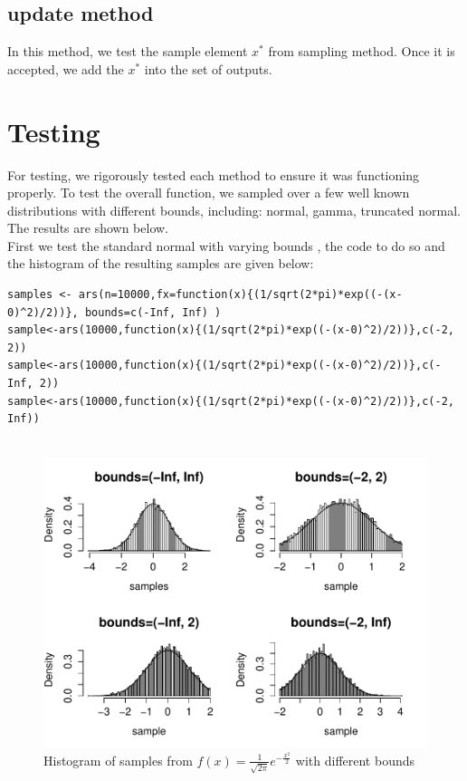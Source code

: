 \documentclass[11pt, oneside]{article}   	%
\begin{document}
\subsection*{ update method }
In this method, we test the sample element $x^{*}$ from sampling method. Once it is accepted, we add the $x^{*}$ into the set of outputs.


\section{Testing}

For testing, we rigorously tested each method to ensure it was functioning properly.  To test the overall function, we sampled over a few well known distributions with different bounds, including:  normal, gamma, truncated normal.  The results are shown below.\\
First we test the standard normal with varying bounds , the code to do so and the histogram of the resulting samples are given below: \newline

\begin{lstlisting}[frame=single]
samples <- ars(n=10000,fx=function(x){(1/sqrt(2*pi)*exp((-(x-0)^2)/2))}, bounds=c(-Inf, Inf) )
sample<-ars(10000,function(x){(1/sqrt(2*pi)*exp((-(x-0)^2)/2))},c(-2, 2))
sample<-ars(10000,function(x){(1/sqrt(2*pi)*exp((-(x-0)^2)/2))},c(-Inf, 2))
sample<-ars(10000,function(x){(1/sqrt(2*pi)*exp((-(x-0)^2)/2))},c(-2, Inf))


\end{lstlisting}
\clearpage
\begin{figure}[htbp!]
 \centering
\caption{Histogram of samples from $f(x)=\frac{1}{\sqrt{2\pi}}e^{-\frac{x^2}{2}}$ with different bounds}
  \includegraphics[width=1.0\textwidth]{standardnormal}
\end{figure}
\end{document}
